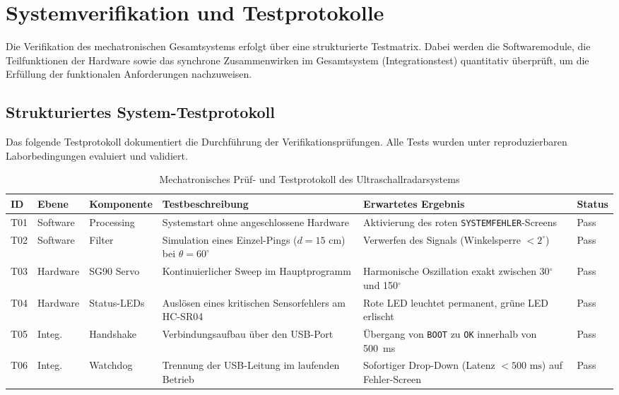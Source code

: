 %
%
%


\chapter{Systemverifikation und Testprotokolle}
\label{chap:Verifikation_Evaluation}

Die Verifikation des mechatronischen Gesamtsystems erfolgt über eine strukturierte Testmatrix. Dabei werden die Softwaremodule, die Teilfunktionen der Hardware sowie das synchrone Zusammenwirken im Gesamtsystem (Integrationstest) quantitativ überprüft, um die Erfüllung der funktionalen Anforderungen nachzuweisen.

\section{Strukturiertes System-Testprotokoll}
Das folgende Testprotokoll dokumentiert die Durchführung der Verifikationsprüfungen. Alle Tests wurden unter reproduzierbaren Laborbedingungen evaluiert und validiert.

\begin{table}[htbp]
	\centering
	\small
	\begin{tabular}{|l|l|l|p{4cm}|p{3.5cm}|l|}
		\hline
		\textbf{ID} & \textbf{Ebene} & \textbf{Komponente} & \textbf{Testbeschreibung} & \textbf{Erwartetes Ergebnis} & \textbf{Status} \\ \hline
		T01 & Software & Processing & Systemstart ohne angeschlossene Hardware & Aktivierung des roten \texttt{SYSTEMFEHLER}-Screens & Pass \\ \hline
		T02 & Software & Filter & Simulation eines Einzel-Pings ($d = 15\text{ cm}$) bei $\theta = 60^\circ$ & Verwerfen des Signals (Winkelsperre $< 2^\circ$) & Pass \\ \hline
		T03 & Hardware & SG90 Servo & Kontinuierlicher Sweep im Hauptprogramm & Harmonische Oszillation exakt zwischen 30$^\circ$ und 150$^\circ$ & Pass \\ \hline
		T04 & Hardware & Status-LEDs & Auslösen eines kritischen Sensorfehlers am HC-SR04 & Rote LED leuchtet permanent, grüne LED erlischt & Pass \\ \hline
		T05 & Integ. & Handshake & Verbindungsaufbau über den USB-Port & Übergang von \texttt{BOOT} zu \texttt{OK} innerhalb von 500~ms & Pass \\ \hline
		T06 & Integ. & Watchdog & Trennung der USB-Leitung im laufenden Betrieb & Sofortiger Drop-Down (Latenz $< 500\text{ ms}$) auf Fehler-Screen & Pass \\ \hline
	\end{tabular}
	\caption{Mechatronisches Prüf- und Testprotokoll des Ultraschallradarsystems}
	\label{tab:Testprotokoll_Gesamt}
\end{table}

